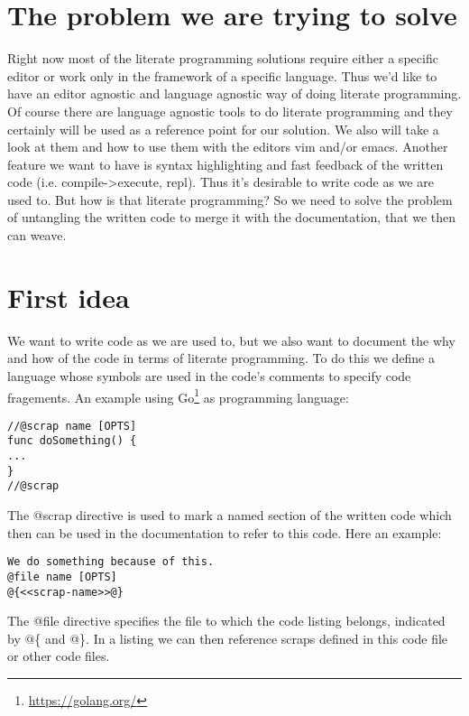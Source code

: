 \documentclass[11pt]{article}
\date{\today}
\title{}
\begin{document}
\setcounter{tocdepth}{3}
\tableofcontents
\newpage
{}

\section{The problem we are trying to solve}
\label{sec:orgheadline1}
Right now most of the literate programming solutions require either a specific
editor or work only in the framework of a specific language. Thus we'd like to
have an editor agnostic and language agnostic way of doing literate programming.
Of course there are language agnostic tools to do literate programming and they
certainly will be used as a reference point for our solution. We also will take
a look at them and how to use them with the editors vim and/or emacs. Another
feature we want to have is syntax highlighting and fast feedback of the written
code (i.e. compile->execute, repl). Thus it's desirable to write code as we are
used to. But how is that literate programming? So we need to solve the problem
of untangling the written code to merge it with the documentation, that we
then can weave.

\section{First idea}
\label{sec:orgheadline4}
We want to write code as we are used to, but we also want to document the
why and how of the code in terms of literate programming. To do this we define
a language whose symbols are used in the code's comments to specify code
fragements. An example using Go\footnote{\url{https://golang.org/}} as programming language:

\begin{verbatim}
//@scrap name [OPTS]
func doSomething() {
...
}
//@scrap
\end{verbatim}

The @scrap directive is used to mark a named section of the written code
which then can be used in the documentation to refer to this code. Here an
example:

\begin{verbatim}
We do something because of this.
@file name [OPTS]
@{<<scrap-name>>@}
\end{verbatim}

The @file directive specifies the file to which the code listing belongs, 
indicated by @\{ and @\}. In a listing we can then reference scraps defined in
this code file or other code files.
\end{document}
